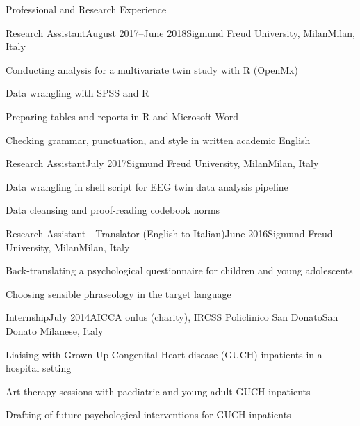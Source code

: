 \documentclass{resume2} %
\begin{document}
\begin{rSection}{Professional and Research Experience}



\begin{rSubsection}{Research Assistant}{August 2017--June 2018}{Sigmund Freud University, Milan}{Milan, Italy}
\item Conducting analysis for a multivariate twin study with R (OpenMx)
\item Data wrangling with SPSS and R%
\item Preparing tables and reports in R and Microsoft Word
\item Checking grammar, punctuation, and style in written academic English
\end{rSubsection}

\begin{rSubsection}{Research Assistant}{July 2017}{Sigmund Freud University, Milan}{Milan, Italy}
\item Data wrangling in shell script for EEG twin data analysis pipeline
\item Data cleansing and proof-reading codebook norms
\end{rSubsection}

\begin{rSubsection}{Research Assistant---Translator (English to Italian)}{June 2016}{Sigmund Freud University, Milan}{Milan, Italy}
\item Back-translating a psychological questionnaire for children and young adolescents
\item Choosing sensible phraseology in the target language
\end{rSubsection}

\begin{rSubsection}{Internship}{July 2014}{AICCA onlus (charity), IRCSS Policlinico San Donato}{San Donato Milanese, Italy}
\item Liaising with Grown-Up Congenital Heart disease (GUCH) inpatients in a hospital setting
\item Art therapy sessions with paediatric and young adult GUCH inpatients
\item Drafting of future psychological interventions for GUCH inpatients
\end{rSubsection}

\end{rSection}
\end{document}
